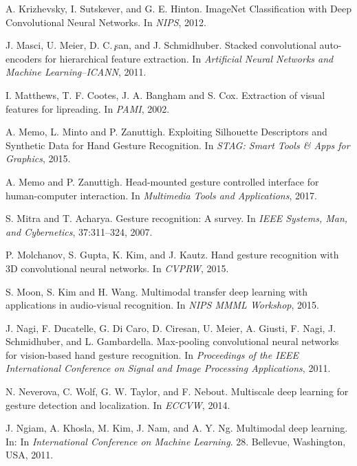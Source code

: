 \begin{thebibliography}{99}
  A. Krizhevsky, I. Sutskever, and G. E. Hinton.  ImageNet Classification
  with Deep Convolutional Neural Networks. In \textit{NIPS}, 2012.

  J. Masci, U. Meier, D. C. ̧san, and J. Schmidhuber.
  Stacked convolutional auto-encoders for hierarchical feature extraction.
  In \textit{Artificial Neural Networks and Machine Learning–ICANN}, 2011.

  I. Matthews, T. F. Cootes, J. A. Bangham and S. Cox. Extraction of visual
  features for lipreading. In \textit{PAMI}, 2002.

  A. Memo, L. Minto and P. Zanuttigh.  Exploiting Silhouette Descriptors and
  Synthetic Data for Hand Gesture Recognition. In \textit{STAG: Smart
    Tools \& Apps for Graphics}, 2015.

  A. Memo and P. Zanuttigh. Head-mounted gesture controlled interface
  for human-computer interaction. In \textit{Multimedia Tools and
  Applications}, 2017.

  S. Mitra and T. Acharya. Gesture recognition: A survey. 
  In \textit{IEEE Systems, Man, and Cybernetics}, 37:311–324, 2007. 

  P. Molchanov, S. Gupta, K. Kim, and J. Kautz. Hand gesture recognition 
  with 3D convolutional neural networks. In \textit{CVPRW}, 2015.

  S. Moon, S. Kim and H. Wang. Multimodal transfer deep learning with
    applications in audio-visual recognition. In \textit{NIPS MMML
    Workshop}, 2015.

  J. Nagi, F. Ducatelle, G. Di Caro, D. Ciresan, U. Meier, A. Giusti,
  F. Nagi, J. Schmidhuber, and L. Gambardella.
  Max-pooling convolutional neural networks for vision-based hand 
  gesture recognition.
  In \textit{Proceedings of the IEEE International Conference on
  Signal and Image Processing Applications}, 2011.

  N. Neverova, C. Wolf, G. W. Taylor, and F. Nebout.  Multiscale deep
  learning for gesture detection and localization. In \textit{ECCVW}, 2014.

  J. Ngiam, A. Khosla, M. Kim, J. Nam, and A. Y. Ng. 
  Multimodal deep learning. In:
  In \textit{International Conference on Machine Learning}.  28. 
  Bellevue, Washington, USA, 2011.


\end{thebibliography}
